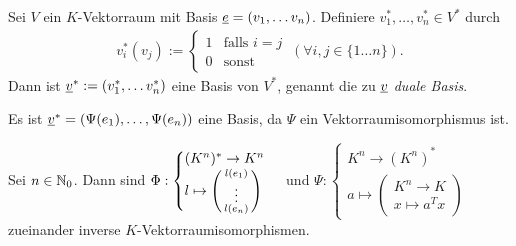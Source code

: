 \documentclass[../../main.tex]{subfiles}
\begin{document}
\begin{kordef}\label{13.1.5}
	Sei $V$ ein $K$-Vektorraum mit Basis ${\underline e}=(v_1,\ldots v_n)$. Definiere $v_1^*,\ldots ,v_n^*\in V^*$ durch
	\begin{align*}
		v_i^*(v_j):=\begin{cases} 1 & \text{falls } i=j\\ 0 & \text{sonst}\end{cases}\ (\forall i,j\in \{1\ldots n\}).
	\end{align*}
	Dann ist ${\underline v}^*:=(v_1^*,\ldots v_n^*)$ eine Basis von $V^*$, genannt die zu ${\underline v}$ \emph{duale Basis}.
\end{kordef}	
\begin{cproof}
	Es ist ${\underline v}^*=(\Psi(e_1),\ldots ,\Psi(e_n))$ eine Basis, da $\Psi$ ein Vektorraumisomorphismus ist.
\end{cproof}

\begin{kor}\label{13.1.6}
	Sei $n\in \mathbb N_0$. Dann sind $\Phi: \begin{cases}(K^n)^*\to K^n\\l\mapsto \left(\begin{smallmatrix}l(e_1)\\\vdots\\l(e_n)\end{smallmatrix}\right)\end{cases}$ und $\Psi: \begin{cases}K^n\to (K^n)^*\\ a\mapsto\begin{pmatrix*}K^n\to K\\ x\mapsto a^Tx\end{pmatrix*}\end{cases}$ zueinander inverse $K$-Vektorraumisomorphismen.
\end{kor}
	
\end{document}
